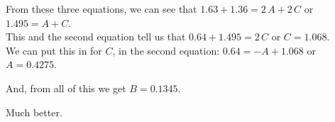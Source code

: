 \documentclass{ximera}
\begin{document}
From these three equations, we can see that $1.63 + 1.36 = 2 \, A + 2 \, C$   or $1.495 = A + C$.  \\

This and the second equation tell us that $0.64 + 1.495 = 2 \, C$ or $C = 1.068$. \\

We can put this in for $C$, in the second equation: $0.64 = -A + 1.068$ or $A = 0.4275$.

And, from all of this we get $B = 0.1345$.






\begin{center}
\end{center}

Much better.
\end{document}
